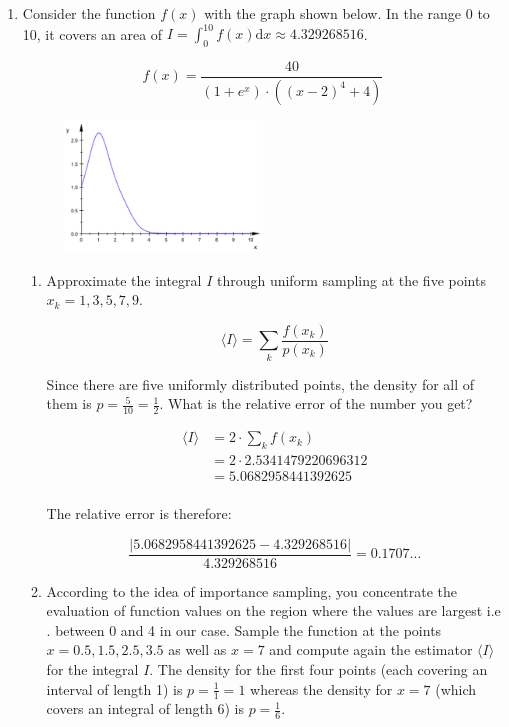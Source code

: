 \documentclass[10pt,\jkfside,a4paper]{article}
\begin{document}
\begin{enumerate}
{IE approximate ambient occlusion can be approximated by curvature.

Ambient occlusion picks up high-frequency features which would otherwise be
saturated.
}

\item Consider the function $f(x)$ with the graph shown below. In the range
0 to 10, it covers an area of
$I = \int^{10}_0 f(x)\text{d}x \approx 4.329268516$.

\[
f(x) = \frac{40}{(1 + e^x)\cdot ((x - 2)^4 + 4)}
\]

\begin{figure}[H]
\centering
\includegraphics[width=0.5\textwidth]{./integral_approximation}
\end{figure}

\begin{enumerate}[label=(\alph*)]

\item Approximate the integral $I$ through uniform sampling at the five
points $x_k = 1, 3, 5, 7, 9$.

\[
\langle I \rangle = \sum_{k}  \frac{f(x_k)}{p(x_k)}
\]

Since there are five uniformly distributed points, the density for all of
them is $p = \frac{5}{10} = \frac{1}{2}$. What is the relative error of the
number you get?

\[
\begin{split}
\langle I \rangle
&= 2 \cdot \sum_k f(x_k) \\
&= 2 \cdot 2.5341479220696312 \\
&= 5.0682958441392625 \\
\end{split}
\]

The relative error is therefore:

\[
\frac{|5.0682958441392625 - 4.329268516|}{4.329268516}
= 0.1707\dots
\]

\item According to the idea of importance sampling, you concentrate the
evaluation of function values on the region where the values are largest i.e
. between 0 and 4 in our case. Sample the function at the points $x = 0.5, 1
.5, 2.5, 3.5$ as well as $x = 7$ and compute again the estimator $ \langle I
\rangle $ for the integral $I$. The density for the first four points (each
covering an interval of length 1) is $p = \frac{1}{1} = 1$ whereas the
density for $x = 7$ (which covers an integral of length 6) is $p =
\frac{1}{6}$.


\end{enumerate}
\end{enumerate}
\end{document}

